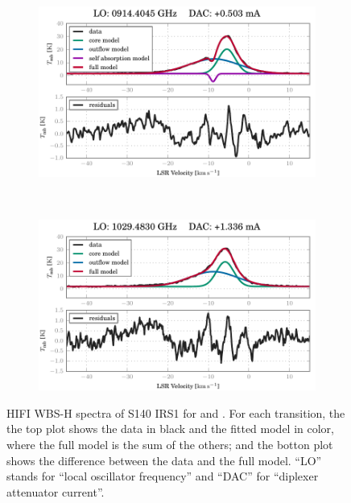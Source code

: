 \begin{figure}[hbtp]
    \centering
    \begin{subfigure}[b]{\textwidth}
        \includegraphics{50015e1d_WBS-H-USB_00-00}
        \caption{}
    \end{subfigure}
    \\
    \begin{subfigure}[b]{\textwidth}
        \includegraphics{50015d89_WBS-H-USB_00-00}
        \caption{}
    \end{subfigure}
    \caption{
        HIFI WBS-H spectra of S140 IRS1 for  and .
        For each transition, the the top plot shows the data in black and the fitted model in color, where the full model is the sum of the others; and the botton plot shows the difference between the data and the full model.
        ``LO'' stands for ``local oscillator frequency'' and ``DAC'' for ``diplexer attenuator current''.
    }
    \label{fig:spectra_transitions}
\end{figure}

